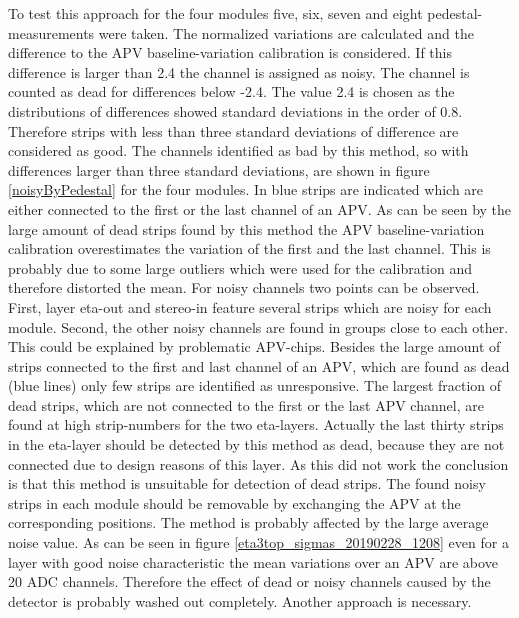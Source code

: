 \documentclass[
twoside,            %
BCOR1.4cm,          %
10pt,               %
headings=normal,    %
headsepline,        %
clearplainpage,		%
final,              %
div=14,
open=right,
bibliography=toc
]{scrreprt}
\begin{document}
To test this approach for the four modules five, six, seven and eight pedestal-measurements were taken.
The normalized variations are calculated and the difference to the APV baseline-variation calibration is considered.
If this difference is larger than 2.4 the channel is assigned as noisy.
The channel is counted as dead for differences below -2.4.
The value 2.4 is chosen as the distributions of differences showed standard deviations in the order of 0.8.
Therefore strips with less than three standard deviations of difference are considered as good.
The channels identified as bad by this method, so with differences larger than three standard deviations, are shown in figure \ref{noisyByPedestal} for the four modules.
In blue strips are indicated which are either connected to the first or the last channel of an APV.
As can be seen by the large amount of dead strips found by this method the APV baseline-variation calibration overestimates the variation of the first and the last channel.
This is probably due to some large outliers which were used for the calibration and therefore distorted the mean.
For noisy channels two points can be observed.
First, layer eta-out and stereo-in feature several strips which are noisy for each module.
Second, the other noisy channels are found in groups close to each other.
This could be explained by problematic APV-chips.
Besides the large amount of strips connected to the first and last channel of an APV, which are found as dead (blue lines) only few strips are identified as unresponsive.
The largest fraction of dead strips, which are not connected to the first or the last APV channel, are found at high strip-numbers for the two eta-layers.
Actually the last thirty strips in the eta-layer should be detected by this method as dead, because they are not connected due to design reasons of this layer.
As this did not work the conclusion is that this method is unsuitable for detection of dead strips.
The found noisy strips in each module should be removable by exchanging the APV at the corresponding positions.
The method is probably affected by the large average noise value.
As can be seen in figure \ref{eta3top_sigmas_20190228_1208} even for a layer with good noise characteristic the mean variations over an APV are above 20 ADC channels.
Therefore the effect of dead or noisy channels caused by the detector is probably washed out completely.
Another approach is necessary. 
\end{document}
